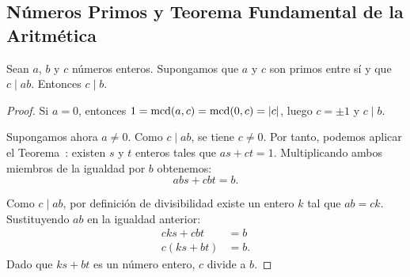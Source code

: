 \subsection{Números Primos y Teorema Fundamental de la Aritmética}

\begin{lemma}\label{lem:euclides}
    Sean $a$, $b$ y $c$ números enteros. Supongamos que $a$ y $c$ son primos entre
    sí y que $c \mid ab$. Entonces $c \mid b$.
\end{lemma}

\begin{proof}
    Si $a = 0$, entonces $1 = \operatorname{mcd}(a, c) = \operatorname{mcd}(0, c) = |c|$,
    luego $c = \pm1$ y $c \mid b$.

    Supongamos ahora $a \ne 0$. Como $c \mid ab$, se tiene $c \ne 0$.
    Por tanto, podemos aplicar el Teorema~: existen $s$ y $t$ enteros
    tales que $as + ct = 1$. Multiplicando ambos miembros de la igualdad por $b$ obtenemos:
    \[ abs + cbt = b. \]

    Como $c \mid ab$, por definición de divisibilidad existe un entero $k$ tal que
    $ab = ck$. Sustituyendo $ab$ en la igualdad anterior:
    \begin{align*}
        cks + cbt &= b \\
        c(ks + bt) &= b.
    \end{align*}
    Dado que $ks + bt$ es un número entero, $c$ divide a $b$.
\end{proof}